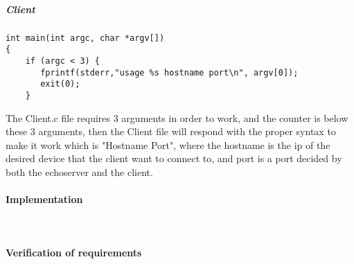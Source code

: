 \subparagraph{Client}
\begin{verbatim}
int main(int argc, char *argv[])
{
    if (argc < 3) {
       fprintf(stderr,"usage %s hostname port\n", argv[0]);
       exit(0);
    }
\end{verbatim}
The Client.c file requires 3 arguments in order to work, and the counter is below these 3 arguments, then the Client file will respond with the proper syntax to make it work which is "Hostname Port", where the hostname is the ip of the desired device that the client want to connect to, and port is a port decided by both the echoserver and the client.

\paragraph{Implementation}\mbox{}\\

\paragraph{Verification of requirements}\mbox{}\\
